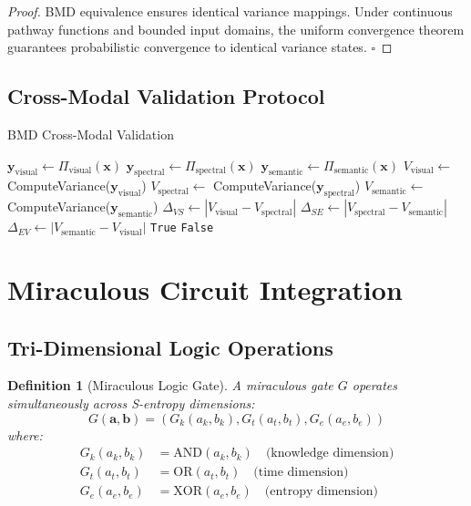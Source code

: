 \documentclass[12pt,a4paper]{article}
\newtheorem{definition}{Definition}
\begin{document}
\begin{proof}
BMD equivalence ensures identical variance mappings. Under continuous pathway functions and bounded input domains, the uniform convergence theorem guarantees probabilistic convergence to identical variance states. $\square$
\end{proof}

\subsection{Cross-Modal Validation Protocol}

\begin{algorithm}[H]
\caption{BMD Cross-Modal Validation}
\begin{algorithmic}[1]
    \State $\mathbf{y}_{\text{visual}} \gets \Pi_{\text{visual}}(\mathbf{x})$
    \State $\mathbf{y}_{\text{spectral}} \gets \Pi_{\text{spectral}}(\mathbf{x})$
    \State $\mathbf{y}_{\text{semantic}} \gets \Pi_{\text{semantic}}(\mathbf{x})$
    \State $V_{\text{visual}} \gets$ ComputeVariance($\mathbf{y}_{\text{visual}}$)
    \State $V_{\text{spectral}} \gets$ ComputeVariance($\mathbf{y}_{\text{spectral}}$)
    \State $V_{\text{semantic}} \gets$ ComputeVariance($\mathbf{y}_{\text{semantic}}$)
    \State $\Delta_{VS} \gets |V_{\text{visual}} - V_{\text{spectral}}|$
    \State $\Delta_{SE} \gets |V_{\text{spectral}} - V_{\text{semantic}}|$
    \State $\Delta_{EV} \gets |V_{\text{semantic}} - V_{\text{visual}}|$
        \State \Return \texttt{True}
    \Else
        \State \Return \texttt{False}
    \EndIf
\EndProcedure
\end{algorithmic}
\end{algorithm}

\section{Miraculous Circuit Integration}

\subsection{Tri-Dimensional Logic Operations}

\begin{definition}[Miraculous Logic Gate]
A miraculous gate $G$ operates simultaneously across S-entropy dimensions:
$$G(\mathbf{a}, \mathbf{b}) = (G_k(a_k, b_k), G_t(a_t, b_t), G_e(a_e, b_e))$$
where:
\begin{align}
G_k(a_k, b_k) &= \text{AND}(a_k, b_k) \quad \text{(knowledge dimension)} \\
G_t(a_t, b_t) &= \text{OR}(a_t, b_t) \quad \text{(time dimension)} \\
G_e(a_e, b_e) &= \text{XOR}(a_e, b_e) \quad \text{(entropy dimension)}
\end{align}
\end{definition}
\end{document}
